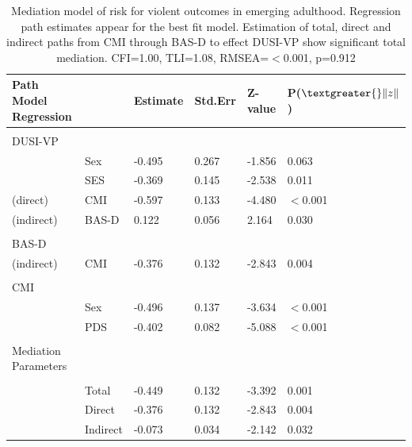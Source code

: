 \documentclass[utf8]{frontiersSCNS} %
\begin{document}
\begin{table}[h!]
\begin{tabular}{llllll}
Path Model Regression & & Estimate & Std.Err & Z-value & P($\textgreater{}\|z\|$) \\ \hline \\
DUSI-VP & & & & \\
& Sex  & -0.495    & 0.267   & -1.856   & 0.063 \\
& SES  & -0.369    & 0.145   & -2.538   & 0.011 \\
(direct) & CMI & -0.597    & 0.133   & -4.480   & $<$0.001 \\
(indirect) & BAS-D & 0.122    & 0.056   & 2.164   & 0.030 \\ \\
BAS-D & & & & \\
(indirect) & CMI  & -0.376    & 0.132   & -2.843   & 0.004 \\ \\
CMI & & & & \\
& Sex & -0.496    & 0.137   & -3.634   & $<$0.001 \\
& PDS  & -0.402    & 0.082   & -5.088   & $<$0.001 \\ \\
Mediation Parameters & & & & \\ \hline \\
& Total  & -0.449    & 0.132   & -3.392   & 0.001 \\
& Direct  & -0.376    & 0.132   & -2.843   & 0.004 \\
& Indirect  & -0.073    & 0.034   & -2.142   & 0.032 \\
\end{tabular}
\caption{Mediation model of risk for violent outcomes in emerging adulthood. Regression path estimates appear for the best fit model. Estimation of total, direct and indirect paths from CMI through BAS-D to effect DUSI-VP show significant total mediation. CFI=1.00, TLI=1.08, RMSEA=$<$0.001, p=0.912\label{tab:5}}
\end{table}
%
\clearpage

%

%
%
\end{document}
